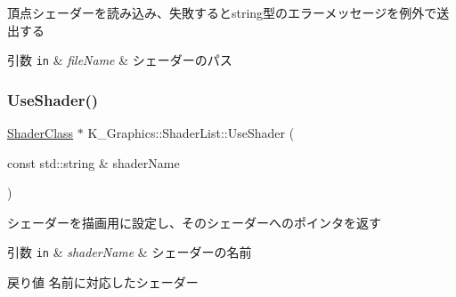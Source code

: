 頂点シェーダーを読み込み、失敗するとstring型のエラーメッセージを例外で送出する 


\begin{DoxyParams}[1]{引数}
\mbox{\tt in}  & {\em file\+Name} & シェーダーのパス \\
\hline
\end{DoxyParams}
\mbox{\label{class_k___graphics_1_1_shader_list_ad903d8c4daca2f2296434afd5694a4c5}} 
\subsubsection{\texorpdfstring{Use\+Shader()}{UseShader()}}
{\footnotesize\ttfamily \mbox{\hyperlink{class_k___graphics_1_1_shader_class}{Shader\+Class}} $\ast$ K\+\_\+\+Graphics\+::\+Shader\+List\+::\+Use\+Shader (\begin{DoxyParamCaption}\item[{const std\+::string \&}]{shader\+Name }\end{DoxyParamCaption})}



シェーダーを描画用に設定し、そのシェーダーへのポインタを返す 


\begin{DoxyParams}[1]{引数}
\mbox{\tt in}  & {\em shader\+Name} & シェーダーの名前 \\
\hline
\end{DoxyParams}
\begin{DoxyReturn}{戻り値}
名前に対応したシェーダー 
\end{DoxyReturn}
